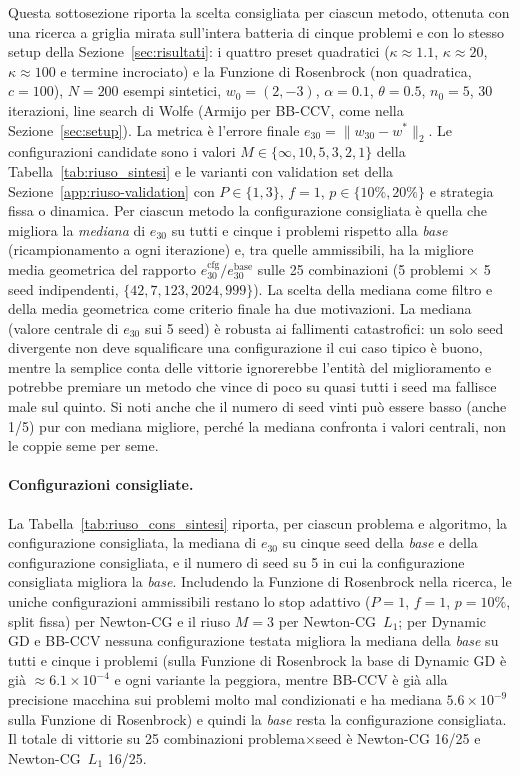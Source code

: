 \documentclass[a4paper,12pt]{article}
\numberwithin{equation}{section}
\numberwithin{figure}{section}
\numberwithin{table}{section}
\begin{document}
Questa sottosezione riporta la scelta consigliata per ciascun metodo, ottenuta
con una ricerca a griglia mirata sull'intera batteria di cinque problemi e con
lo stesso setup della Sezione~\ref{sec:risultati}: i quattro preset quadratici
($\kappa\approx 1.1$, $\kappa\approx 20$, $\kappa\approx 100$ e termine
incrociato) e la Funzione di Rosenbrock (non quadratica, $c{=}100$),
$N = 200$ esempi sintetici, $w_0 = (2,-3)$, $\alpha = 0.1$,
$\theta = 0.5$, $n_0 = 5$, 30 iterazioni, line search di Wolfe (Armijo per
BB-CCV, come nella Sezione~\ref{sec:setup}). La metrica è l'errore finale
$e_{30} = \|w_{30} - w^*\|_2$. Le configurazioni candidate sono i valori
$M \in \{\infty, 10, 5, 3, 2, 1\}$ della
Tabella~\ref{tab:riuso_sintesi} e le varianti con validation set della
Sezione~\ref{app:riuso-validation} con $P \in \{1, 3\}$, $f = 1$,
$p \in \{10\%, 20\%\}$ e strategia fissa o dinamica. Per ciascun metodo la
configurazione consigliata è quella che migliora la \emph{mediana} di $e_{30}$
su tutti e cinque i problemi rispetto alla \emph{base} (ricampionamento a ogni
iterazione) e, tra quelle ammissibili, ha la migliore media geometrica del
rapporto $e_{30}^{\mathrm{cfg}}/e_{30}^{\mathrm{base}}$ sulle 25 combinazioni
(5 problemi $\times$ 5 seed indipendenti, $\{42,7,123,2024,999\}$).
La scelta della mediana come filtro e della media geometrica come criterio finale ha due motivazioni. La mediana (valore centrale di $e_{30}$ sui 5 seed) è robusta ai fallimenti catastrofici: un solo seed divergente non deve squalificare una configurazione il cui caso tipico è buono, mentre la semplice conta delle vittorie ignorerebbe l'entità del miglioramento e potrebbe premiare un metodo che vince di poco su quasi tutti i seed ma fallisce male sul quinto. Si noti anche che il numero di seed vinti può essere basso (anche 1/5) pur con mediana migliore, perché la mediana confronta i valori centrali, non le coppie seme per seme.

\paragraph{Configurazioni consigliate.}
La Tabella~\ref{tab:riuso_cons_sintesi} riporta, per ciascun problema e
algoritmo, la configurazione consigliata, la mediana di $e_{30}$ su cinque seed
della \emph{base} e della configurazione consigliata, e il numero di seed su 5
in cui la configurazione consigliata migliora la \emph{base}. Includendo la
Funzione di Rosenbrock nella ricerca, le uniche configurazioni ammissibili restano lo stop
adattivo ($P{=}1$, $f{=}1$, $p{=}10\%$, split fissa) per Newton-CG e il riuso
$M{=}3$ per Newton-CG~$L_1$; per Dynamic GD e BB-CCV nessuna configurazione
testata migliora la mediana della \emph{base} su tutti e cinque i problemi
(sulla Funzione di Rosenbrock la base di Dynamic GD è già $\approx6.1\times10^{-4}$ e ogni
variante la peggiora, mentre BB-CCV è già alla precisione macchina sui problemi
molto mal condizionati e ha mediana $5.6\times10^{-9}$ sulla Funzione di Rosenbrock) e quindi
la \emph{base} resta la configurazione consigliata. Il totale di vittorie su 25
combinazioni problema$\times$seed è Newton-CG 16/25 e Newton-CG~$L_1$ 16/25.
\end{document}
